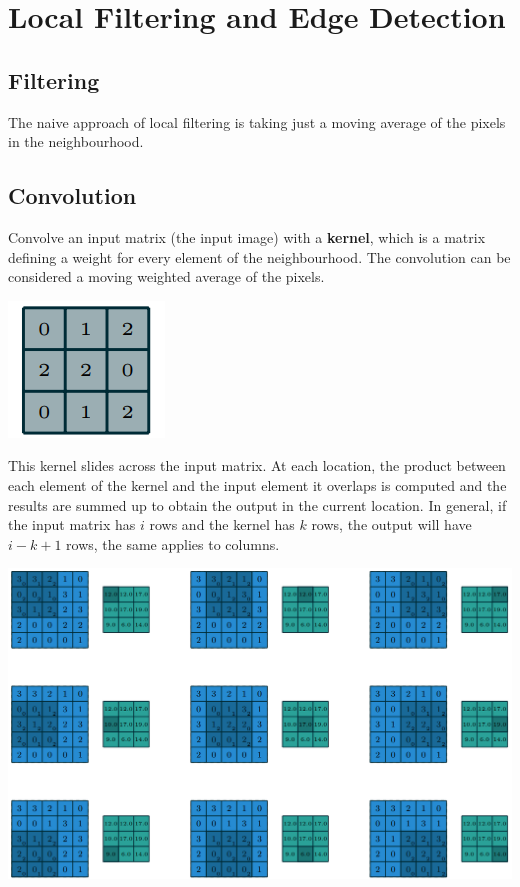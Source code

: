\section{Local Filtering and Edge Detection}
\subsection{Filtering}
The naive approach of local filtering is taking just a moving average of the pixels in the neighbourhood.

\subsection{Convolution}
Convolve an input matrix (the input image) with a \textbf{kernel}, which is a matrix defining a weight for every element of the neighbourhood.
The convolution can be considered a moving weighted average of the pixels.
\begin{center}
	\includegraphics[width=0.4\linewidth]{img/Kernel_Convolution}
\end{center}
This kernel slides across the input matrix. At each location, the product between each element of the kernel and the input element it overlaps
is computed and the results are summed up to obtain the output in the current location.
In general, if the input matrix has  $i$ rows and the kernel has $k$ rows, the output will have $i-k+1$ rows, the same applies to columns.
\begin{center}
	\includegraphics[width=0.8\linewidth]{img/ConvolutionOutput}
\end{center}

